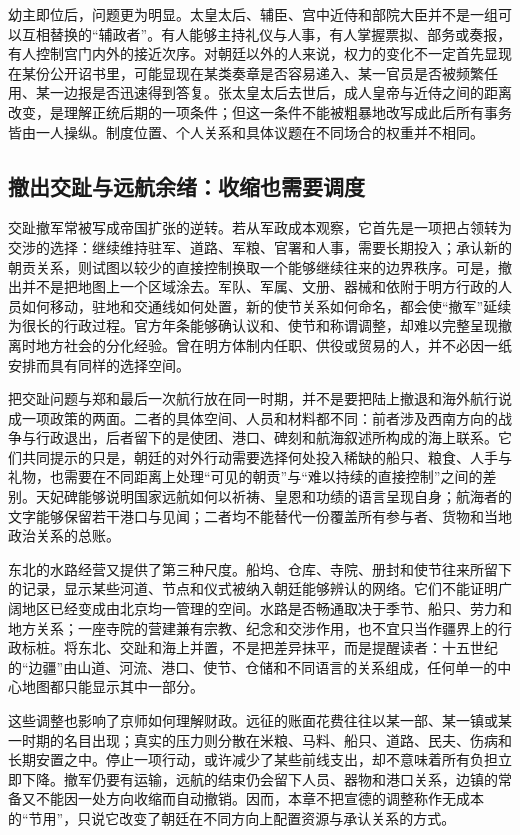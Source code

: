 幼主即位后，问题更为明显。太皇太后、辅臣、宫中近侍和部院大臣并不是一组可以互相替换的“辅政者”。有人能够主持礼仪与人事，有人掌握票拟、部务或奏报，有人控制宫门内外的接近次序。对朝廷以外的人来说，权力的变化不一定首先显现在某份公开诏书里，可能显现在某类奏章是否容易递入、某一官员是否被频繁任用、某一边报是否迅速得到答复。张太皇太后去世后，成人皇帝与近侍之间的距离改变，是理解正统后期的一项条件；但这一条件不能被粗暴地改写成此后所有事务皆由一人操纵。制度位置、个人关系和具体议题在不同场合的权重并不相同。

\subsection{撤出交趾与远航余绪：收缩也需要调度}

交趾撤军常被写成帝国扩张的逆转。若从军政成本观察，它首先是一项把占领转为交涉的选择：继续维持驻军、道路、军粮、官署和人事，需要长期投入；承认新的朝贡关系，则试图以较少的直接控制换取一个能够继续往来的边界秩序。可是，撤出并不是把地图上一个区域涂去。军队、军属、文册、器械和依附于明方行政的人员如何移动，驻地和交通线如何处置，新的使节关系如何命名，都会使“撤军”延续为很长的行政过程。官方年条能够确认议和、使节和称谓调整，却难以完整呈现撤离时地方社会的分化经验。曾在明方体制内任职、供役或贸易的人，并不必因一纸安排而具有同样的选择空间。

把交趾问题与郑和最后一次航行放在同一时期，并不是要把陆上撤退和海外航行说成一项政策的两面。二者的具体空间、人员和材料都不同：前者涉及西南方向的战争与行政退出，后者留下的是使团、港口、碑刻和航海叙述所构成的海上联系。它们共同提示的只是，朝廷的对外行动需要选择何处投入稀缺的船只、粮食、人手与礼物，也需要在不同距离上处理“可见的朝贡”与“难以持续的直接控制”之间的差别。天妃碑能够说明国家远航如何以祈祷、皇恩和功绩的语言呈现自身；航海者的文字能够保留若干港口与见闻；二者均不能替代一份覆盖所有参与者、货物和当地政治关系的总账。

东北的水路经营又提供了第三种尺度。船坞、仓库、寺院、册封和使节往来所留下的记录，显示某些河道、节点和仪式被纳入朝廷能够辨认的网络。它们不能证明广阔地区已经变成由北京均一管理的空间。水路是否畅通取决于季节、船只、劳力和地方关系；一座寺院的营建兼有宗教、纪念和交涉作用，也不宜只当作疆界上的行政标桩。将东北、交趾和海上并置，不是把差异抹平，而是提醒读者：十五世纪的“边疆”由山道、河流、港口、使节、仓储和不同语言的关系组成，任何单一的中心地图都只能显示其中一部分。

这些调整也影响了京师如何理解财政。远征的账面花费往往以某一部、某一镇或某一时期的名目出现；真实的压力则分散在米粮、马料、船只、道路、民夫、伤病和长期安置之中。停止一项行动，或许减少了某些前线支出，却不意味着所有负担立即下降。撤军仍要有运输，远航的结束仍会留下人员、器物和港口关系，边镇的常备又不能因一处方向收缩而自动撤销。因而，本章不把宣德的调整称作无成本的“节用”，只说它改变了朝廷在不同方向上配置资源与承认关系的方式。

